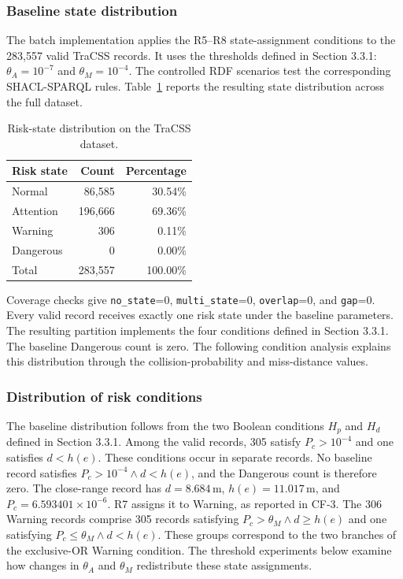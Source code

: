 \documentclass[Royal,sageh,times]{sagej}
\begin{document}
\subsubsection{Baseline state distribution}

The batch implementation applies the R5--R8 state-assignment conditions to the 283,557 valid TraCSS records. It uses the thresholds defined in Section 3.3.1: $\theta_A=10^{-7}$ and $\theta_M=10^{-4}$. The controlled RDF scenarios test the corresponding SHACL-SPARQL rules. Table~\ref{tab:tracss-state-distribution} reports the resulting state distribution across the full dataset.
\begin{table}[!htbp]
  \centering
  \caption{Risk-state distribution on the TraCSS dataset.}
  \label{tab:tracss-state-distribution}
  \footnotesize
  \begin{tabular}{lrr}
    \toprule
    \textbf{Risk state} & \textbf{Count} & \textbf{Percentage} \\
    \midrule
    Normal & 86,585 & 30.54\% \\
    Attention & 196,666 & 69.36\% \\
    Warning & 306 & 0.11\% \\
    Dangerous & 0 & 0.00\% \\
    Total & 283,557 & 100.00\% \\
    \bottomrule
  \end{tabular}
\end{table}
Coverage checks give \texttt{no\_state}=0, \texttt{multi\_state}=0, \texttt{overlap}=0, and \texttt{gap}=0. Every valid record receives exactly one risk state under the baseline parameters. The resulting partition implements the four conditions defined in Section 3.3.1. The baseline Dangerous count is zero. The following condition analysis explains this distribution through the collision-probability and miss-distance values.

\subsubsection{Distribution of risk conditions}

The baseline distribution follows from the two Boolean conditions $H_p$ and $H_d$ defined in Section 3.3.1. Among the valid records, 305 satisfy $P_c>10^{-4}$ and one satisfies $d<h(e)$. These conditions occur in separate records. No baseline record satisfies $P_c>10^{-4}\land d<h(e)$, and the Dangerous count is therefore zero. The close-range record has $d=8.684$\,m, $h(e)=11.017$\,m, and $P_c=6.593401\times10^{-6}$. R7 assigns it to Warning, as reported in CF-3. The 306 Warning records comprise 305 records satisfying $P_c>\theta_M\land d\geq h(e)$ and one satisfying $P_c\leq\theta_M\land d<h(e)$. These groups correspond to the two branches of the exclusive-OR Warning condition. The threshold experiments below examine how changes in $\theta_A$ and $\theta_M$ redistribute these state assignments.
\end{document}

